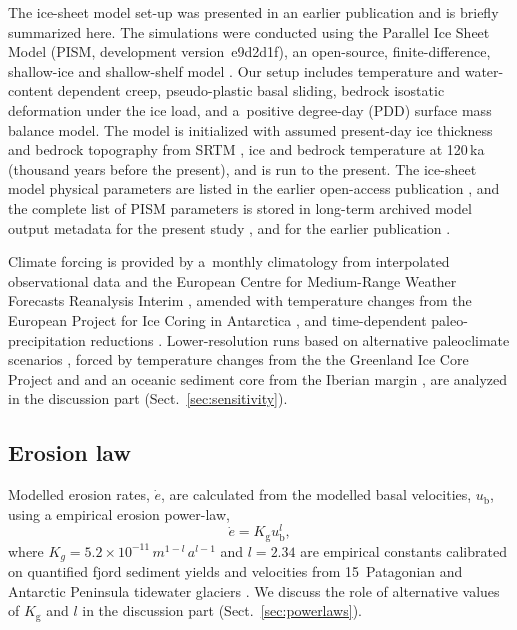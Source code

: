 \documentclass[esurf, manuscript]{copernicus}
\begin{document}
    The ice-sheet model set-up was presented in an earlier publication
    \citep{Seguinot.etal.2018} and is briefly summarized here. The simulations
    were conducted using the Parallel Ice Sheet Model (PISM, development
    version~e9d2d1f), an open-source, finite-difference, shallow-ice and
    shallow-shelf model \citep{PISM-authors.2017}. Our setup includes
    temperature and water-content dependent creep, pseudo-plastic basal
    sliding, bedrock isostatic deformation under the ice
    load, and a~positive degree-day (PDD) surface mass balance model. The model
    is initialized with assumed present-day ice thickness and bedrock topography
    from SRTM \citep{Jarvis.etal.2008},
    ice and bedrock temperature at 120\,ka (thousand years before the present),
    and is run to the present. The ice-sheet model physical parameters are listed
    in the earlier open-access publication \citep{Seguinot.etal.2018}, and the
    complete list of PISM
    parameters is stored in long-term archived model output metadata for the
    present study \citep{Seguinot.2021}, and for the earlier publication
    \citep{Seguinot.2020, Seguinot.2020a}.

    Climate forcing is provided by a~monthly climatology from interpolated
    observational data \citep[WorldClim;][]{Hijmans.etal.2005} and the European
    Centre for Medium-Range Weather Forecasts Reanalysis Interim
    \citep[ERA-Interim;][]{Dee.etal.2011}, amended with temperature changes
    from the European Project for Ice Coring in Antarctica
    \citep[EPICA;][] {Jouzel.etal.2007}, and time-dependent paleo-precipitation
    reductions \citep{Huybrechts.2002}. Lower-resolution runs based on
    alternative paleoclimate scenarios \citep{Seguinot.etal.2018}, forced by
    temperature changes from the the Greenland Ice Core Project
    \citep[GRIP;][]{Dansgaard.etal.1993} and and an oceanic sediment core from
    the Iberian margin \citep[MD01-2444;][]{Martrat.etal.2007}, are analyzed
    in the discussion part (Sect.~\ref{sec:sensitivity}).

\subsection{Erosion law}

    Modelled erosion rates, $\dot{e}$, are calculated from the modelled basal
    velocities, $u_\mathrm{b}$, using a empirical erosion power-law,
    \begin{equation}
        \dot{e} = K_\mathrm{g} u_\mathrm{b}^l ,
    \end{equation}
    where $K_g = 5.2\times 10^{-11}\,m^{1-l}\,a^{l-1}$ and $l = 2.34$ are
    empirical constants calibrated on quantified fjord sediment yields and
    velocities from 15~Patagonian and Antarctic Peninsula tidewater glaciers
    \citep[using the full dataset from][including outliers]{Koppes.etal.2015}.
    We discuss the role of alternative values of
    $K_\mathrm{g}$ and $l$ in the discussion part (Sect.~\ref{sec:powerlaws}).
\end{document}
